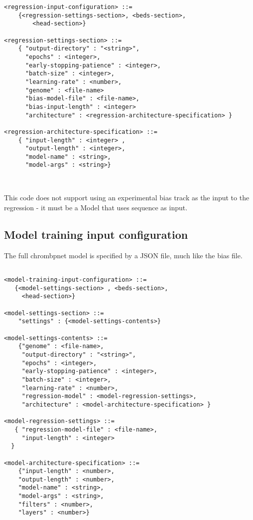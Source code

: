 \documentclass{article}
\begin{document}
\begin{lstlisting}
<regression-input-configuration> ::=
    {<regression-settings-section>, <beds-section>, 
        <head-section>}

<regression-settings-section> ::=
    { "output-directory" : "<string>", 
      "epochs" : <integer>, 
      "early-stopping-patience" : <integer>, 
      "batch-size" : <integer>, 
      "learning-rate" : <number>, 
      "genome" : <file-name>
      "bias-model-file" : <file-name>,
      "bias-input-length" : <integer>    
      "architecture" : <regression-architecture-specification> } 

<regression-architecture-specification> ::= 
    { "input-length" : <integer> ,
      "output-length" : <integer>,
      "model-name" : <string>, 
      "model-args" : <string>}



\end{lstlisting}

This code does not support using an experimental bias track as the input to the regression - it must be a Model that uses sequence as input.

\subsection{Model training input configuration}
The full chrombpnet model is specified by a JSON file, much like the bias file.

\begin{lstlisting}

<model-training-input-configuration> ::= 
   {<model-settings-section> , <beds-section>, 
     <head-section>}

<model-settings-section> ::= 
    "settings" : {<model-settings-contents>}

<model-settings-contents> ::= 
    {"genome" : <file-name>, 
     "output-directory" : "<string>", 
     "epochs" : <integer>, 
     "early-stopping-patience" : <integer>, 
     "batch-size" : <integer>, 
     "learning-rate" : <number>, 
     "regression-model" : <model-regression-settings>,
     "architecture" : <model-architecture-specification> } 

<model-regression-settings> ::= 
   { "regression-model-file" : <file-name>, 
     "input-length" : <integer>
  }

<model-architecture-specification> ::= 
    {"input-length" : <number>, 
    "output-length" : <number>,
    "model-name" : <string>,
    "model-args" : <string>,
    "filters" : <number>,
    "layers" : <number>}
\end{lstlisting}
\end{document}
